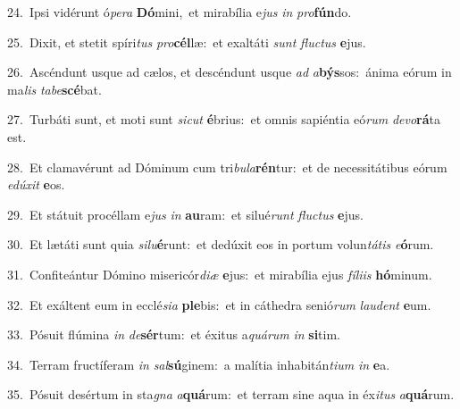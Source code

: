 {\numbfont\textcolor{\numbcolor}{24.}}~Ipsi vidérunt ó\-\textit{pe}\-\textit{ra} \textbf{Dó}\-mini,~\star et mirabília e\textit{jus} \textit{in} \textit{pro}\-\textbf{fún}do.\par
{\numbfont\textcolor{\numbcolor}{25.}}~Dixit, et stetit spíri\textit{tus} \textit{pro}\-\textbf{cél}læ:~\star et exaltáti \textit{sunt} \textit{fluc}\-\textit{tus} \textbf{e}\-jus.\par
{\numbfont\textcolor{\numbcolor}{26.}}~Ascéndunt usque ad cælos, et descéndunt usque \textit{ad} \textit{a}\-\textbf{býs}sos:~\star ánima eórum in ma\textit{lis} \textit{ta}\-\textit{be}\textbf{scé}bat.\par
{\numbfont\textcolor{\numbcolor}{27.}}~Turbáti sunt, et moti sunt \textit{sic}\-\textit{ut} \textbf{é}\-brius:~\star et omnis sapiéntia eó\textit{rum} \textit{de}\-\textit{vo}\textbf{rá}ta est.\par
{\numbfont\textcolor{\numbcolor}{28.}}~Et clamavérunt ad Dóminum cum tri\-\textit{bu}\-\textit{la}\textbf{rén}tur:~\star et de necessitátibus eórum \textit{e}\-\textit{dú}\textit{xit} \textbf{e}\-os.\par
{\numbfont\textcolor{\numbcolor}{29.}}~Et státuit procéllam e\textit{jus} \textit{in} \textbf{au}\-ram:~\star et silué\textit{runt} \textit{fluc}\-\textit{tus} \textbf{e}\-jus.\par
{\numbfont\textcolor{\numbcolor}{30.}}~Et lætáti sunt quia \textit{si}\-\textit{lu}\textbf{é}runt:~\star et dedúxit eos in portum volun\-\textit{tá}\-\textit{tis} \textit{e}\-\textbf{ó}rum.\par
{\numbfont\textcolor{\numbcolor}{31.}}~Confiteántur Dómino misericór\-\textit{di}\-\textit{æ} \textbf{e}\-jus:~\star et mirabília ejus \textit{fí}\-\textit{li}\textit{is} \textbf{hó}\-minum.\par
{\numbfont\textcolor{\numbcolor}{32.}}~Et exáltent eum in ecclé\-\textit{si}\-\textit{a} \textbf{ple}\-bis:~\star et in cáthedra senió\textit{rum} \textit{lau}\-\textit{dent} \textbf{e}\-um.\par
{\numbfont\textcolor{\numbcolor}{33.}}~Pósuit flúmina \textit{in} \textit{de}\-\textbf{sér}tum:~\star et éxitus a\-\textit{quá}\-\textit{rum} \textit{in} \textbf{si}\-tim.\par
{\numbfont\textcolor{\numbcolor}{34.}}~Terram fructíferam \textit{in} \textit{sal}\-\textbf{sú}ginem:~\star a malítia inhabitán\-\textit{ti}\-\textit{um} \textit{in} \textbf{e}\-a.\par
{\numbfont\textcolor{\numbcolor}{35.}}~Pósuit desértum in sta\textit{gna} \textit{a}\-\textbf{quá}rum:~\star et terram sine aqua in éx\-\textit{i}\-\textit{tus} \textit{a}\-\textbf{quá}rum.\par
